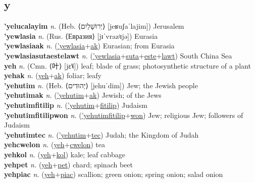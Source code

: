 \subsection{y}

\textbf{'yelucalayim} \textit{n.} (Heb. ⟨יְרוּשָׁלַיִם⟩ [jeʁuʃaˈlajim])
Jerusalem \label{'yelucalayim} \\
\textbf{'yewlasia} \textit{n.} (Rus. ⟨Евразия⟩ [jɪˈvrazʲɪjə])
Eurasia \label{'yewlasia} \\
\textbf{'yewlasiaak} \textit{n.} (\hyperref['yewlasia]{'yewlasia}+\hyperref[ak]{ak})
Eurasian; from Eurasia \label{'yewlasiaak} \\
\textbf{'yewlasiasutaestelawt} \textit{n.} (\hyperref['yewlasia]{'yewlasia}+\hyperref[suta]{suta}+\hyperref[este]{este}+\hyperref[lawt]{lawt})
South China Sea \label{'yewlasiasutaestelawt} \\
\textbf{yeh} \textit{n.} (Cmn. ⟨叶⟩ [jɛ˥˩])
leaf; blade of grass; photosynthetic structure of a plant \label{yeh} \\
\textbf{yehak} \textit{n.} (\hyperref[yeh]{yeh}+\hyperref[ak]{ak})
foliar; leafy \label{yehak} \\
\textbf{'yehutim} \textit{n.} (Heb. ⟨יְהוּדִים⟩ [jehuˈdim])
Jew; the Jewish people \label{'yehutim} \\
\textbf{'yehutimak} \textit{n.} (\hyperref['yehutim]{'yehutim}+\hyperref[ak]{ak})
Jewish; of the Jews \label{'yehutimak} \\
\textbf{'yehutimfitilip} \textit{n.} (\hyperref['yehutim]{'yehutim}+\hyperref[fitilip]{fitilip})
Judaism \label{'yehutimfitilip} \\
\textbf{'yehutimfitilipwon} \textit{n.} (\hyperref['yehutimfitilip]{'yehutimfitilip}+\hyperref[won]{won})
Jew; religious Jew; followers of Judaism \label{'yehutimfitilipwon} \\
\textbf{'yehutimtec} \textit{n.} (\hyperref['yehutim]{'yehutim}+\hyperref[tec]{tec})
Judah; the Kingdom of Judah \label{'yehutimtec} \\
\textbf{yehcwelon} \textit{n.} (\hyperref[yeh]{yeh}+\hyperref[cwelon]{cwelon})
tea \label{yehcwelon} \\
\textbf{yehkol} \textit{n.} (\hyperref[yeh]{yeh}+\hyperref[kol]{kol})
kale; leaf cabbage \label{yehkol} \\
\textbf{yehpet} \textit{n.} (\hyperref[yeh]{yeh}+\hyperref[pet]{pet})
chard; spinach beet \label{yehpet} \\
\textbf{yehpiac} \textit{n.} (\hyperref[yeh]{yeh}+\hyperref[piac]{piac})
scallion; green onion; spring onion; salad onion \label{yehpiac} \\
